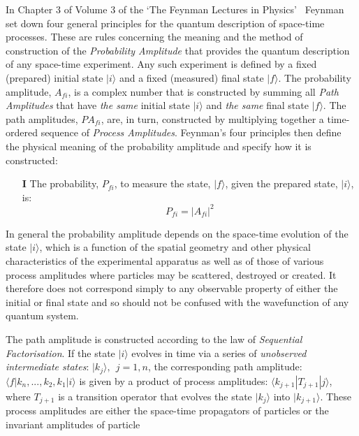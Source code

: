 {
 In Chapter 3 of Volume 3 of the `The Feynman Lectures in Physics'~\cite{Feyn2} Feynman set down
 four general principles for the quantum description of space-time processes. These are rules
  concerning the meaning and the method of construction of the {\it Probability Amplitude} 
  that provides the quantum description of any space-time experiment. Any such experiment is
  defined by a fixed (prepared) initial state $|i\rangle$ and a fixed (measured) final state
  $|f\rangle$. The probability amplitude, $A_{fi}$, is a complex number that is constructed
   by summing
  all {\it Path Amplitudes} that have {\it the same} initial state $|i\rangle$ and {\it the same}
  final state $|f\rangle$.
  The path amplitudes, $PA_{fi}$, are, in turn, constructed by multiplying together a time-ordered sequence
  of {\it Process Amplitudes}.  Feynman's four principles then define the physical meaning
  of the probability amplitude and specify how it is constructed:
  \begin{itemize}
  \item[{\bf I}] The probability, $P_{fi}$, to measure the state,  $|f\rangle$, given the
    prepared state,  $|i\rangle$, is:
   \begin{equation}
      P_{fi} = \left|A_{fi}\right|^2
  \end{equation}
  \end{itemize}
   In general the probability amplitude depends on the space-time evolution of the state $|i\rangle$, 
   which is a function of the spatial geometry and other physical characteristics of the
   experimental apparatus as well as of those of various process amplitudes where particles may be
    scattered,
   destroyed or created. It therefore does not correspond simply to any observable property
   of either the initial or final state and so should not be confused with the wavefunction
   of any quantum system.
  \par The path amplitude is constructed according to the law of {\it Sequential Factorisation}.
    If the state  $|i\rangle$  evolves in time via a series of {\it unobserved 
   intermediate states}: $|k_j\rangle,~~j=1,n$, the corresponding  path amplitude:
    $\langle f|k_n,...,k_2,k_1|i \rangle$ is given by a product of process amplitudes:  
   $\langle k_{j+1}|T_{j+1}|j\rangle$, where $T_{j+1}$ is a transition
    operator that evolves the state  $|k_j\rangle$ into  $|k_{j+1}\rangle$. These process amplitudes
    are either the space-time propagators of particles or the invariant amplitudes of particle
}
